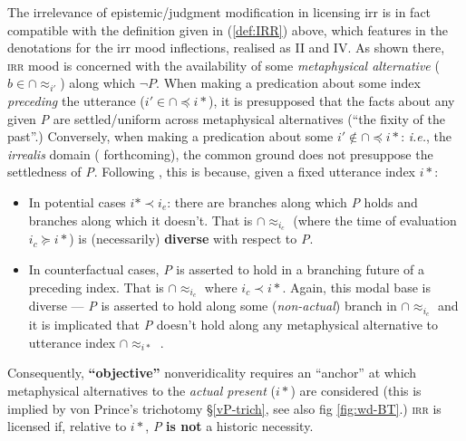 The irrelevance of epistemic/judgment modification in licensing \gls{irr} is in fact compatible with the definition given in (\ref{def:IRR}) above, which features in the denotations for the \gls{irr} mood inflections, realised as \gls{II} and \gls{IV}. As shown there, \textsc{irr} mood is concerned with the availability of some \textit{metaphysical alternative} ($ b\in\cap{\approx_{i'}} $) along which $ \neg\textit{P} $. When making a predication about some index \textit{preceding} the utterance ($ i'\in\cap{\preccurlyeq}i* $), it is presupposed that the facts about any given \textit{P} are settled/uniform across metaphysical alternatives (``the fixity of the past''.) Conversely, when making a predication about some $ i'\notin\cap{\preccurlyeq}i* $: \textit{i.e.}, the \textit{irrealis} domain (\citealp{VonPrincea} forthcoming), the common ground does not presuppose the settledness of \textit{P}. Following \citet[ \S~4]{Condoravdi2002}, this is because, given a fixed utterance index $ i* $:
\begin{itemize}
	\item In potential cases $ i*\prec i_e $: there are branches along which \textit{P} holds and branches along which it doesn't. That is $ \cap{\approx_{i_c}} $ (where the time of evaluation $ i_c\succcurlyeq i* $) is (necessarily) \textbf{diverse} with respect to \textit{P}.
	\item In counterfactual cases, \textit{P} is asserted to hold in a branching future of a preceding index. That is $ \cap{\approx_{i_c}} $ where $ i_c\prec i* $. Again, this modal base is diverse --- \textit{P} is asserted to hold along some (\textit{non-actual}) branch in $ \cap{\approx_{i_c}} $ and it is implicated that \textit{P} doesn't hold along any metaphysical alternative to utterance index $ \cap{\approx_{i*}} $ \citep[86]{Condoravdi2002}.
\end{itemize}

Consequently, \textbf{``objective''} nonveridicality requires an ``anchor'' at which metaphysical alternatives to the \textit{actual present} ($ i* $) are considered (this is implied by von Prince's trichotomy \S \ref{vP-trich}, see also fig \ref{fig:wd-BT}.) \textsc{irr} is licensed if, relative to $ i* $, \textit{P} \textbf{is not} a historic necessity.


%
%
%
%
%


